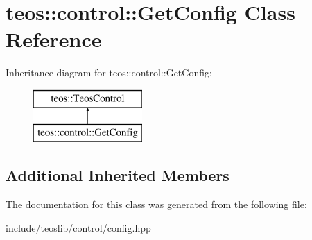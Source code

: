 \hypertarget{classteos_1_1control_1_1_get_config}{}\section{teos\+:\+:control\+:\+:Get\+Config Class Reference}
\label{classteos_1_1control_1_1_get_config}
Inheritance diagram for teos\+:\+:control\+:\+:Get\+Config\+:\begin{figure}[H]
\begin{center}
\leavevmode
\includegraphics[height=2.000000cm]{classteos_1_1control_1_1_get_config}
\end{center}
\end{figure}
\subsection*{Additional Inherited Members}


The documentation for this class was generated from the following file\+:\begin{DoxyCompactItemize}
\item 
include/teoslib/control/config.\+hpp\end{DoxyCompactItemize}
